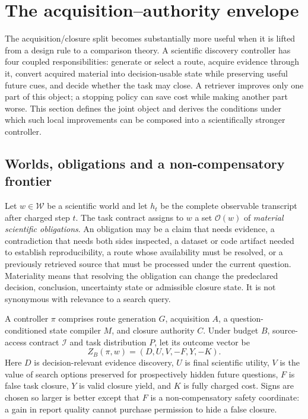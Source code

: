 \section{The acquisition--authority envelope}
\label{sec:envelope}

The acquisition/closure split becomes substantially more useful when it is
lifted from a design rule to a comparison theory.  A scientific discovery
controller has four coupled responsibilities: generate or select a route,
acquire evidence through it, convert acquired material into decision-usable
state while preserving useful future cues, and decide whether the task may
close.  A retriever improves only one part of this object; a stopping policy can
save cost while making another part worse.  This section defines the joint
object and derives the conditions under which such local improvements can be
composed into a scientifically stronger controller.

\subsection{Worlds, obligations and a non-compensatory frontier}

Let $w\in\mathcal W$ be a scientific world and let $h_t$ be the complete
observable transcript after charged step $t$.  The task contract assigns to
$w$ a set $\mathcal O(w)$ of \emph{material scientific obligations}.  An
obligation may be a claim that needs evidence, a contradiction that needs both
sides inspected, a dataset or code artifact needed to establish reproducibility,
a route whose availability must be resolved, or a previously retrieved source
that must be processed under the current question.  Materiality means that
resolving the obligation can change the predeclared decision, conclusion,
uncertainty state or admissible closure state.  It is not synonymous with
relevance to a search query.

A controller $\pi$ comprises route generation $G$, acquisition $A$, a
question-conditioned state compiler $M$, and closure authority $C$.  Under
budget $B$, source-access contract $\mathcal I$ and task distribution $P$, let
its outcome vector be
\[
 Z_B(\pi,w)=(D,U,V,-F,Y,-K).
\]
Here $D$ is decision-relevant evidence discovery, $U$ is final scientific
utility, $V$ is the value of search options preserved for prospectively hidden
future questions, $F$ is false task closure, $Y$ is valid closure yield, and
$K$ is fully charged cost.  Signs are chosen so larger is better except that
$F$ is a non-compensatory safety coordinate: a gain in report quality cannot
purchase permission to hide a false closure.


